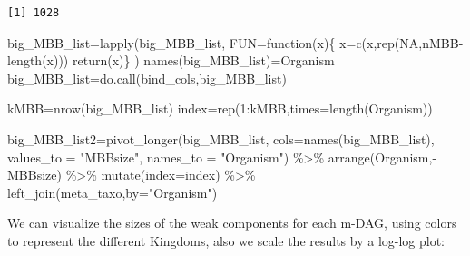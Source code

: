 \documentclass[
  letterpaper,
  DIV=11,
  numbers=noendperiod]{scrreprt}
\newenvironment{Shaded}{}{}
\newcommand{\AttributeTok}[1]{\textcolor[rgb]{0.78,0.47,0.87}{#1}}
\newcommand{\ConstantTok}[1]{\textcolor[rgb]{0.82,0.60,0.40}{#1}}
\newcommand{\ControlFlowTok}[1]{\textcolor[rgb]{0.78,0.47,0.87}{#1}}
\newcommand{\DecValTok}[1]{\textcolor[rgb]{0.82,0.60,0.40}{#1}}
\newcommand{\FunctionTok}[1]{\textcolor[rgb]{0.38,0.69,0.94}{#1}}
\newcommand{\NormalTok}[1]{\textcolor[rgb]{0.67,0.70,0.75}{#1}}
\newcommand{\OtherTok}[1]{\textcolor[rgb]{0.15,0.68,0.38}{#1}}
\newcommand{\SpecialCharTok}[1]{\textcolor[rgb]{0.34,0.71,0.76}{#1}}
\newcommand{\StringTok}[1]{\textcolor[rgb]{0.60,0.76,0.47}{#1}}
\begin{document}
\begin{verbatim}
[1] 1028
\end{verbatim}

\begin{Shaded}
\begin{Highlighting}[]
\NormalTok{big\_MBB\_list}\OtherTok{=}\FunctionTok{lapply}\NormalTok{(big\_MBB\_list,}
                    \AttributeTok{FUN=}\ControlFlowTok{function}\NormalTok{(x)\{}
\NormalTok{                      x}\OtherTok{=}\FunctionTok{c}\NormalTok{(x,}\FunctionTok{rep}\NormalTok{(}\ConstantTok{NA}\NormalTok{,nMBB}\SpecialCharTok{{-}}\FunctionTok{length}\NormalTok{(x)))}
                      \FunctionTok{return}\NormalTok{(x)\}}
\NormalTok{)}
\FunctionTok{names}\NormalTok{(big\_MBB\_list)}\OtherTok{=}\NormalTok{Organism}
\NormalTok{big\_MBB\_list}\OtherTok{=}\FunctionTok{do.call}\NormalTok{(bind\_cols,big\_MBB\_list)}

\NormalTok{kMBB}\OtherTok{=}\FunctionTok{nrow}\NormalTok{(big\_MBB\_list)}
\NormalTok{index}\OtherTok{=}\FunctionTok{rep}\NormalTok{(}\DecValTok{1}\SpecialCharTok{:}\NormalTok{kMBB,}\AttributeTok{times=}\FunctionTok{length}\NormalTok{(Organism))}


\NormalTok{big\_MBB\_list2}\OtherTok{=}\FunctionTok{pivot\_longer}\NormalTok{(big\_MBB\_list,}
                           \AttributeTok{cols=}\FunctionTok{names}\NormalTok{(big\_MBB\_list),}
                           \AttributeTok{values\_to =} \StringTok{"MBBsize"}\NormalTok{,}
                           \AttributeTok{names\_to =} \StringTok{"Organism"}\NormalTok{) }\SpecialCharTok{\%\textgreater{}\%} 
  \FunctionTok{arrange}\NormalTok{(Organism,}\SpecialCharTok{{-}}\NormalTok{MBBsize) }\SpecialCharTok{\%\textgreater{}\%}  
  \FunctionTok{mutate}\NormalTok{(}\AttributeTok{index=}\NormalTok{index) }\SpecialCharTok{\%\textgreater{}\%} 
  \FunctionTok{left\_join}\NormalTok{(meta\_taxo,}\AttributeTok{by=}\StringTok{"Organism"}\NormalTok{)}
\end{Highlighting}
\end{Shaded}

We can visualize the sizes of the weak components for each m-DAG, using
colors to represent the different Kingdoms, also we scale the results by
a log-log plot:
\end{document}

